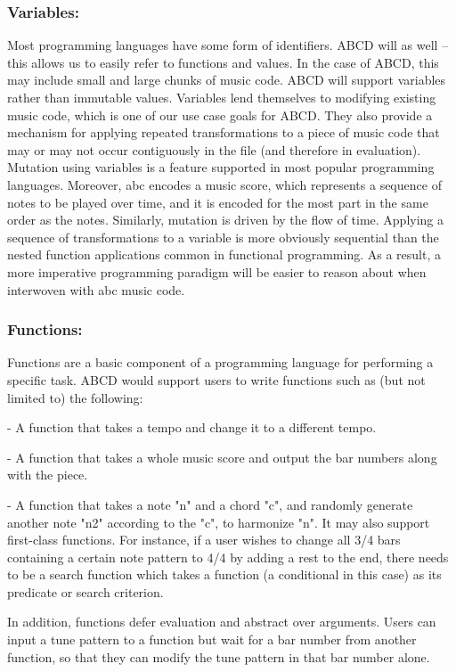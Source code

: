 	\subsubsection{Variables:}
	Most programming languages have some form of identifiers. ABCD will as well -- this allows us to easily refer to functions and values. In the case of ABCD, this may include small and large chunks of music code. ABCD will support variables rather than immutable values. Variables lend themselves to modifying existing music code, which is one of our use case goals for ABCD. They also provide a mechanism for applying repeated transformations to a piece of music code that may or may not occur contiguously in the file (and therefore in evaluation). Mutation using variables is a feature supported in most popular programming languages. Moreover, abc encodes a music score, which represents a sequence of notes to be played over time, and it is encoded for the most part in the same order as the notes. Similarly, mutation is driven by the flow of time. Applying a sequence of transformations to a variable is more obviously sequential than the nested function applications common in functional programming. As a result, a more imperative programming paradigm will be easier to reason about when interwoven with abc music code.

	\subsubsection{Functions:}
	Functions are a basic component of a programming language for performing a specific task. ABCD would support users to write functions such as (but not limited to) the following:

	- A function that takes a tempo and change it to a different tempo.

 	- A function that takes a whole music score and output the bar numbers along with the piece.
 	
	- A function that takes a note "n" and a chord "c", and randomly generate another note "n2" according to the "c", to harmonize "n".
	  It may also support first-class functions. For instance, if a user wishes to change all 3/4 bars containing a certain note pattern to 4/4 by adding a rest to the end, there needs to be a search function which takes a function (a conditional in this case) as its predicate or search criterion. 

	 In addition, functions defer evaluation and abstract over arguments. Users can input a tune pattern to a function but wait for a bar number from another function, so that they can modify the tune pattern in that bar number alone.  


